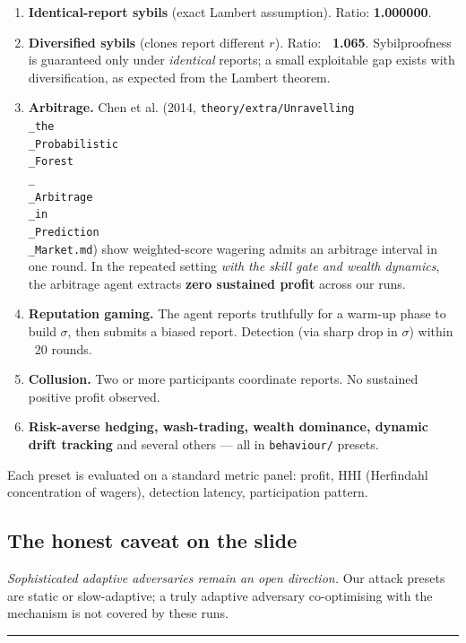 \documentclass[11pt]{article}
\begin{document}
\begin{enumerate}
\item \textbf{Identical-report sybils} (exact Lambert assumption). Ratio: \textbf{1.000000}.
\item \textbf{Diversified sybils} (clones report different $r$). Ratio: \textbf{~1.065}. Sybilproofness is guaranteed only under \emph{identical} reports; a small exploitable gap exists with diversification, as expected from the Lambert theorem.
\item \textbf{Arbitrage.} Chen et al. (2014, \texttt{theory/extra/Unravelling\\_the\\_Probabilistic\\_Forest\\_\\_Arbitrage\\_in\\_Prediction\\_Market.md}) show weighted-score wagering admits an arbitrage interval in one round. In the repeated setting \emph{with the skill gate and wealth dynamics}, the arbitrage agent extracts \textbf{zero sustained profit} across our runs.
\item \textbf{Reputation gaming.} The agent reports truthfully for a warm-up phase to build $\sigma$, then submits a biased report. Detection (via sharp drop in $\sigma$) within ~20 rounds.
\item \textbf{Collusion.} Two or more participants coordinate reports. No sustained positive profit observed.
\item \textbf{Risk-averse hedging, wash-trading, wealth dominance, dynamic drift tracking} and several others --- all in \texttt{behaviour/} presets.
\end{enumerate}

Each preset is evaluated on a standard metric panel: profit, HHI (Herfindahl concentration of wagers), detection latency, participation pattern.

\subsection{The honest caveat on the slide}


\emph{Sophisticated adaptive adversaries remain an open direction.} Our attack presets are static or slow-adaptive; a truly adaptive adversary co-optimising with the mechanism is not covered by these runs.

\bigskip\hrule\bigskip
\end{document}
